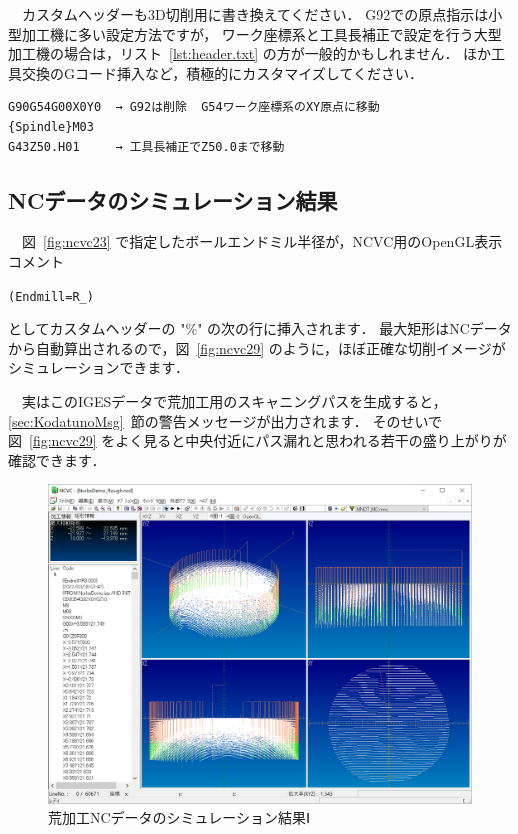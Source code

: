 \vspace*{2zh}
　カスタムヘッダーも3D切削用に書き換えてください．
G92での原点指示は小型加工機に多い設定方法ですが，
ワーク座標系と工具長補正で設定を行う大型加工機の場合は，リスト~\ref{lst:header.txt} の方が一般的かもしれません．
ほか工具交換のGコード挿入など，積極的にカスタマイズしてください．

\begin{lstlisting}[caption=カスタムヘッダーの例,numbers=none,label=lst:header.txt]
%
G90G54G00X0Y0  → G92は削除  G54ワーク座標系のXY原点に移動
{Spindle}M03
G43Z50.H01     → 工具長補正でZ50.0まで移動
\end{lstlisting}

\subsection{NCデータのシミュレーション結果}
　図~\ref{fig:ncvc23} で指定したボールエンドミル半径が，NCVC用のOpenGL表示コメント

\vspace*{0.5zh}
\begin{breakbox}
\vspace*{-0.25cm}
\small
\begin{alltt}
(Endmill=R_)
\end{alltt}
\vspace*{-0.1cm}
\end{breakbox}

としてカスタムヘッダーの "\%" の次の行に挿入されます．
最大矩形はNCデータから自動算出されるので，図~\ref{fig:ncvc29} のように，ほぼ正確な切削イメージがシミュレーションできます．

　実はこのIGESデータで荒加工用のスキャニングパスを生成すると，\ref{sec:KodatunoMsg}~節の警告メッセージが出力されます．
そのせいで 図~\ref{fig:ncvc29} をよく見ると中央付近にパス漏れと思われる若干の盛り上がりが確認できます．

\begin{figure}[H]
\centering
\includegraphics[scale=0.5]{No2/fig/fig28.png}
\caption{荒加工NCデータのシミュレーション結果Ⅰ}
\label{fig:ncvc28}
\end{figure}

